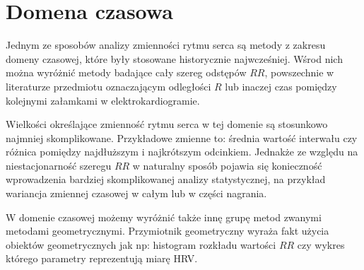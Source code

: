 \section{Domena czasowa}

Jednym ze sposobów analizy zmienności rytmu serca są metody z zakresu domeny czasowej,
które były stosowane historycznie najwcześniej. 
Wśrod nich można wyróżnić metody
badające cały szereg odstępów $RR$, powszechnie w literaturze przedmiotu oznaczającym
odległości $R$ lub inaczej czas pomiędzy kolejnymi załamkami w elektrokardiogramie.

Wielkości określające zmienność rytmu serca w tej domenie są stosunkowo najmniej
skomplikowane. Przykładowe zmienne to: średnia wartość interwału czy różnica pomiędzy
najdłuższym i najkrótszym odcinkiem. Jednakże ze względu na niestacjonarność szeregu $RR$
w naturalny sposób pojawia się konieczność wprowadzenia bardziej skomplikowanej analizy
statystycznej, na przykład wariancja zmiennej czasowej w całym lub w części nagrania.

W domenie czasowej możemy wyróżnić także innę grupę metod zwanymi metodami geometrycznymi.
Przymiotnik geometryczny wyraża fakt użycia obiektów geometrycznych jak np:
histogram rozkładu wartości $RR$ czy wykres \PP{} którego parametry reprezentują miarę HRV. 






